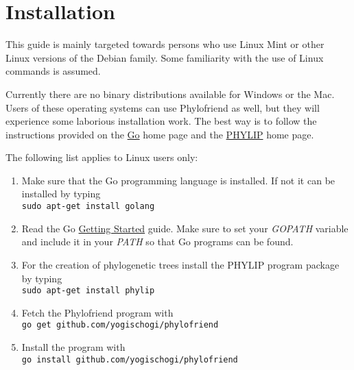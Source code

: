 \section{Installation}

This guide is mainly targeted towards persons who use Linux Mint
or other Linux versions of the Debian family. Some familiarity
with the use of Linux commands is assumed.

Currently there are no binary distributions available for
Windows or the Mac. Users of these operating systems can
use Phylofriend as well, but they will experience some
laborious installation work. The best way is to follow the
instructions provided on the
\href{http://golang.org/}{Go} home page and the
\href{http://evolution.genetics.washington.edu/phylip.html}{PHYLIP}
home page.

The following list applies to Linux users only:

\begin{enumerate}
\item Make sure that the Go programming language is installed.
	If not it can be installed by typing\\
	\texttt{sudo apt-get install golang}
\item Read the Go
	\href{http://golang.org/doc/install}{Getting Started}
	guide. Make sure to set your \emph{GOPATH} variable and
	include it in your \emph{PATH} so that Go programs can be
	found.
\item For the creation of phylogenetic trees install the
	PHYLIP program package by typing\\
	\texttt{sudo apt-get install phylip}
\item Fetch the Phylofriend program with\\
	\texttt{go get github.com/yogischogi/phylofriend}
\item Install the program with\\
	 \texttt{go install github.com/yogischogi/phylofriend}
\end{enumerate}

